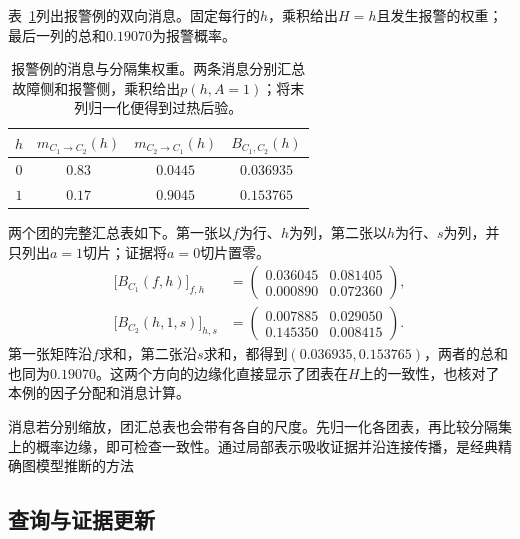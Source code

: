 表~\ref{tab:pgm-junction-tree-calibrated-separator}列出报警例的双向消息。固定每行的$h$，乘积给出$H=h$且发生报警的权重；最后一列的总和$0.19070$为报警概率。

\begin{table}[htbp]
  \centering
  \begin{tabular}{cccc}
    \toprule
    $h$ & $m_{C_1\to C_2}(h)$ & $m_{C_2\to C_1}(h)$ & $B_{C_1,C_2}(h)$\\
    \midrule
    $0$ & $0.83$ & $0.0445$ & $0.036935$\\
    $1$ & $0.17$ & $0.9045$ & $0.153765$\\
    \bottomrule
  \end{tabular}
  \caption{报警例的消息与分隔集权重。两条消息分别汇总故障侧和报警侧，乘积给出$p(h,A=1)$；将末列归一化便得到过热后验。}
  \label{tab:pgm-junction-tree-calibrated-separator}
\end{table}

两个团的完整汇总表如下。第一张以$f$为行、$h$为列，第二张以$h$为行、$s$为列，并只列出$a=1$切片；证据将$a=0$切片置零。
\begin{equation}
  \begin{aligned}
    \bigl[B_{C_1}(f,h)\bigr]_{f,h}
      &=\begin{pmatrix}
          0.036045&0.081405\\
          0.000890&0.072360
        \end{pmatrix},\\
    \bigl[B_{C_2}(h,1,s)\bigr]_{h,s}
      &=\begin{pmatrix}
          0.007885&0.029050\\
          0.145350&0.008415
        \end{pmatrix}.
  \end{aligned}
  \label{eq:pgm-junction-tree-device-calibrated-tables}
\end{equation}
第一张矩阵沿$f$求和，第二张沿$s$求和，都得到$(0.036935,0.153765)$，两者的总和也同为$0.19070$。这两个方向的边缘化直接显示了团表在$H$上的一致性，也核对了本例的因子分配和消息计算。

消息若分别缩放，团汇总表也会带有各自的尺度。先归一化各团表，再比较分隔集上的概率边缘，即可检查一致性。通过局部表示吸收证据并沿连接传播，是经典精确图模型推断的方法

\subsection{查询与证据更新}
\label{sec:pgm-junction-tree-queries-updates}

